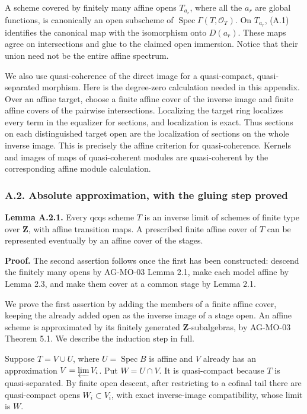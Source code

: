 \documentclass[11pt]{article}
\begin{document}
A scheme covered by finitely many affine opens \(T_{a_r}\), where all
the \(a_r\) are global functions, is canonically an open subscheme of
\(\operatorname{Spec}\Gamma(T,\mathcal O_T)\). On \(T_{a_r}\), (A.1)
identifies the canonical map with the isomorphism onto \(D(a_r)\). These
maps agree on intersections and glue to the claimed open immersion.
Notice that their union need not be the entire affine spectrum.

We also use quasi-coherence of the direct image for a quasi-compact,
quasi-separated morphism. Here is the degree-zero calculation needed in
this appendix. Over an affine target, choose a finite affine cover of
the inverse image and finite affine covers of the pairwise
intersections. Localizing the target ring localizes every term in the
equalizer for sections, and localization is exact. Thus sections on each
distinguished target open are the localization of sections on the whole
inverse image. This is precisely the affine criterion for
quasi-coherence. Kernels and images of maps of quasi-coherent modules
are quasi-coherent by the corresponding affine module calculation.

\subsubsection{A.2. Absolute approximation, with the gluing step
proved}\label{a.2.-absolute-approximation-with-the-gluing-step-proved}

\textbf{Lemma A.2.1.} Every qcqs scheme \(T\) is an inverse limit of
schemes of finite type over \(\mathbf Z\), with affine transition maps.
A prescribed finite affine cover of \(T\) can be represented eventually
by an affine cover of the stages.

\textbf{Proof.} The second assertion follows once the first has been
constructed: descend the finitely many opens by AG-MO-03 Lemma 2.1, make
each model affine by Lemma 2.3, and make them cover at a common stage by
Lemma 2.1.

We prove the first assertion by adding the members of a finite affine
cover, keeping the already added open as the inverse image of a stage
open. An affine scheme is approximated by its finitely generated
\(\mathbf Z\)-subalgebras, by AG-MO-03 Theorem 5.1. We describe the
induction step in full.

Suppose \(T=V\cup U\), where \(U=\operatorname{Spec}B\) is affine and
\(V\) already has an approximation \(V=\varprojlim V_i\). Put
\(W=U\cap V\). It is quasi-compact because \(T\) is quasi-separated. By
finite open descent, after restricting to a cofinal tail there are
quasi-compact opens \(W_i\subset V_i\), with exact inverse-image
compatibility, whose limit is \(W\).
\end{document}
